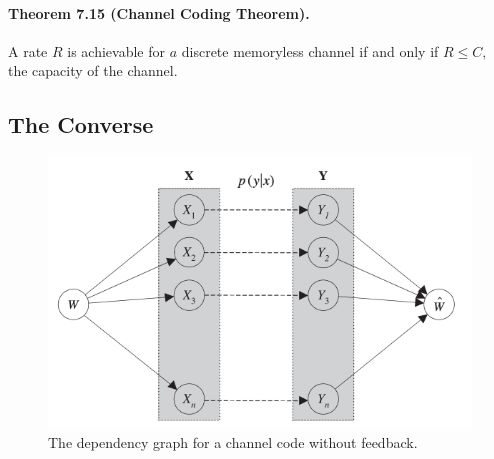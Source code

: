 \documentclass[8pt]{article}
\begin{document}
\begin{tcolorbox}
	\paragraph{Theorem 7.15 (Channel Coding Theorem).} A rate $R$ is achievable for $a$ discrete memoryless channel if and only if $R \leq C,$ the capacity of the channel.
\end{tcolorbox}

\subsection{The Converse}

\begin{figure}[!h]
	\centering
	\includegraphics[width=0.5\linewidth]{imgs/exp7_9.png}
	\caption{The dependency graph for a channel code without feedback.}
	\label{fig:my_label}
\end{figure}
\end{document}
